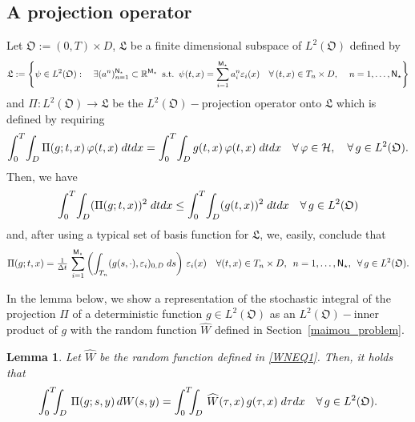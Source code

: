 \documentclass[10pt]{amsart}
\newtheorem{lemma}{Lemma}[section]
\numberwithin{equation}{section}
\begin{document}
\subsection{A projection operator}
Let ${\mathfrak O}:=(0,T)\times D$, ${\mathfrak L}$ be a finite dimensional
subspace of $L^2({\mathfrak O})$ defined by  
\begin{equation*}
{\mathfrak L}:=\left\{\psi\in L^2({\mathfrak O}):\quad \exists (a^n)_{n=1}^{{\scriptscriptstyle}{\sf N}_{\star}}
\subset{\mathbb R}^{{\scriptscriptstyle}{{\sf M}_{\star}}}
\,\,\,\text{\rm s.t.}\,\,\,\psi(t,x)=\sum_{i=1}^{{\scriptscriptstyle}{\sf M}_{\star}}a^n_i\varepsilon_i(x)
\quad\forall\,(t,x)\in T_n\times D,\quad\, n=1,\dots,{\sf N}_{\star}\right\}
\end{equation*}
and $\Pi:L^2({\mathfrak O})\rightarrow{\mathfrak L}$ be the
$L^2({\mathfrak O})-$projection operator onto ${\mathfrak L}$ 
which is defined by requiring
\begin{equation*}
\int_0^{{\scriptscriptstyle} T}\!\int_{{\scriptscriptstyle} D}\Pi(g;t,x)\,\varphi(t,x)\;dtdx
=\int_0^{{\scriptscriptstyle} T}\!\int_{{\scriptscriptstyle} D}g(t,x)\,\varphi(t,x)\;dtdx
\quad\forall\,\varphi\in{\mathcal H},
\quad\forall\,g\in L^2({\mathfrak O}).
\end{equation*}
Then, we have
\begin{equation}\label{KatiL2}
\int_0^{{\scriptscriptstyle} T}\!\int_{{\scriptscriptstyle} D}(\Pi(g;t,x))^2\;dtdx\leq\int_0^{{\scriptscriptstyle} T}\!\int_{{\scriptscriptstyle} D}(g(t,x))^2\;dtdx
\quad\forall\,g\in L^2({\mathfrak O})
\end{equation}
and, after using a typical set of basis function for ${\mathfrak L}$, we, easily, conclude that
\begin{equation}\label{Defin_L2}
\Pi(g;t,x)=\tfrac{1}{\Delta t}\, \sum_{i=1}^{{\scriptscriptstyle} {\sf M}_{\star}}
\left(\int_{{\scriptscriptstyle} T_n}(g(s,\cdot),\varepsilon_i)_{{\scriptscriptstyle} 0,D}\;ds\right)\,\varepsilon_i(x)
\quad\forall(t,x)\in T_n\times D,
\,\,\, n=1,\dots,{\sf N}_{\star},
\,\,\,\forall\,g\in L^2({\mathfrak O}).
\end{equation}
\par
In the lemma below, we show a representation of the stochastic integral
of the projection $\Pi$ of a deterministic function $g\in L^2({\mathfrak O})$ as an
$L^2({\mathfrak O})-$inner product of $g$ with the random function
${\widehat W}$ defined in Section~\ref{maimou_problem}.
\begin{lemma}\label{Lhmma1}
Let ${\widehat W}$ be the random function defined in \eqref{WNEQ1}.
Then, it holds that
\begin{equation}\label{WNEQ2}
\int_0^{{\scriptscriptstyle} T}\!\!\!\int_{{\scriptscriptstyle} D}\,\Pi(g;s,y)\,dW(s,y)
=\int_0^{{\scriptscriptstyle} T}\!\!\!\int_{{\scriptscriptstyle} D}\,{\widehat W}(\tau,x)\,g(\tau,x)\;{d\tau}dx
\quad\forall\,g\in L^2({\mathfrak O}).
\end{equation}
\end{lemma}
\end{document}
